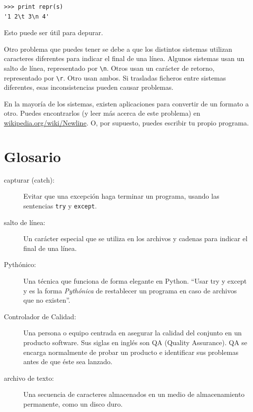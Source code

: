 \beforeverb
\begin{verbatim}
>>> print repr(s)
'1 2\t 3\n 4'
\end{verbatim}
\afterverb

Esto puede ser útil para depurar.

Otro problema que puedes tener se debe a que los distintos sistemas
utilizan caracteres diferentes para indicar el final de una línea. Algunos
sistemas usan un salto de línea, representado por \verb"\n". Otros
usan un carácter de retorno, representado por \verb"\r". Otro usan ambos.
Si trasladas ficheros entre sistemas diferentes, esas inconsistencias
pueden causar problemas.


En la mayoría de los sistemas, existen aplicaciones para convertir de un
formato a otro. Puedes encontrarlos (y leer más acerca de este
problema) en \url{wikipedia.org/wiki/Newline}.  O, por supuesto, puedes
escribir tu propio programa.


\section{Glosario}

\begin{description}

\item[capturar (catch):] Evitar que una excepción haga terminar
un programa, usando las sentencias {\tt try} y {\tt except}.

\item[salto de línea:] Un carácter especial que se utiliza en los archivos y cadenas
para indicar el final de una línea.

\item[Pythónico:] Una técnica que funciona de forma elegante en Python.
``Usar try y except y es la forma \emph{Pythónica} de restablecer un programa en
caso de archivos que no existen''.

\item[Controlador de Calidad:] Una persona o equipo centrada en asegurar
la calidad del conjunto en un producto software.
Sus siglas en inglés son QA (Quality Assurance). QA se encarga normalmente
de probar un producto e identificar sus problemas antes de que éste
sea lanzado.

\item[archivo de texto:] Una secuencia de caracteres almacenados en un
medio de almacenamiento permanente, como un disco duro.

\end{description}


